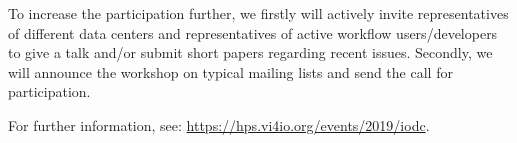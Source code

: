 \documentclass[a4paper,10pt]{article}
\begin{document}
To increase the participation further, we firstly will actively invite representatives of different data centers and representatives of active workflow users/developers to give a talk and/or submit short papers regarding recent issues.
Secondly, we will announce the workshop on typical mailing lists and send the call for participation.


For further information, see:
\url{https://hps.vi4io.org/events/2019/iodc}.

\end{document}
